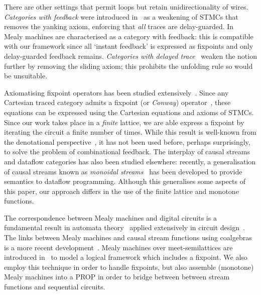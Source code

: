 \documentclass{lmcs}
\begin{document}
There are other settings that permit loops but retain unidirectionality of
wires.
\emph{Categories with feedback} were introduced in~\cite{katis2002feedback} as a
weakening of STMCs that removes the yanking axiom, enforcing that \emph{all}
traces are delay-guarded.
In~\cite{dilavore2021canonical} Mealy machines are characterised as a category
with feedback: this is compatible with our framework since all `instant
feedback' is expressed as fixpoints and only delay-guarded feedback remains.
\emph{Categories with delayed trace}~\cite{sprunger2019differentiable} weaken
the notion further by removing the sliding axiom; this prohibits the unfolding
rule so would be unsuitable.

Axiomatising fixpoint operators has been studied
extensively~\cite{bloom1993iteration,stefanescu2000network,simpson2000complete}.
Since any Cartesian traced category admits a fixpoint (or \emph{Conway})
operator~\cite{hasegawa1997recursion}, these equations can be expressed using
the Cartesian equations and axioms of STMCs.
Since our work takes place in a \emph{finite} lattice, we are able express a
fixpoint by iterating the circuit a finite number of times.
While this result is well-known from the denotational
perspective~\cite{stoltenberg-hansen1994mathematical}, it has not been used
before, perhaps surprisingly, to solve the problem of combinational feedback.
The interplay of causal streams and dataflow categories has also been studied
elsewhere: recently, a generalisation of causal streams known as
\emph{monoidal streams}~\cite{dilavore2022monoidala} has been developed to
provide semantics to dataflow programming.
Although this generalises some aspects of this paper, our approach differs in
the use of the finite lattice and monotone functions.

The correspondence between Mealy machines and digital circuits is a fundamental
result in automata theory~\cite{mealy1955method} applied extensively in circuit
design~\cite{kohavi2009switching}.
The links between Mealy machines and causal stream functions using coalgebras is
a more recent
development~\cite{rutten2005coinductive,rutten2005algebra,rutten2006algebraic}.
Mealy machines over meet-semilattices are introduced
in~\cite{bonsangue2008coalgebraic} to model a logical framework which includes
a fixpoint.
We also employ this technique in order to handle fixpoints, but also assemble
(monotone) Mealy machines into a PROP in order to bridge between
between stream functions and sequential circuits.
\end{document}
